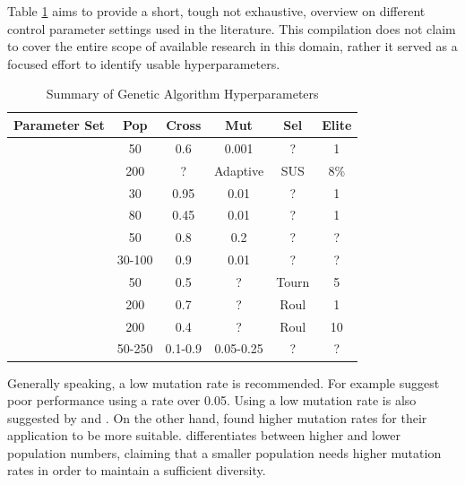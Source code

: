 Table \ref{tab:ga_hyperparameters} aims to provide a short, tough not exhaustive, overview on different control parameter settings used in the literature. This compilation does not claim to cover the entire scope of available research in this domain, rather it served as a focused effort to identify usable hyperparameters.

\begin{table}[h]
	\centering
	\caption{Summary of Genetic Algorithm Hyperparameters}
	\label{tab:ga_hyperparameters}
	\begin{tabular}{lccccc}
		\hline
		\textbf{Parameter Set} & \textbf{Pop} & \textbf{Cross} & \textbf{Mut} & \textbf{Sel} & \textbf{Elite} \\
		\hline
		\cite{de_jong_analysis_1975} & 50 & 0.6 & 0.001 & ? & 1 \\
		\cite{mills_determining_2015} & 200 & ? & Adaptive & SUS & 8\% \\
		\cite{grefenstette_optimization_1986} & 30 & 0.95 & 0.01 & ? & 1 \\
		\cite{grefenstette_optimization_1986} & 80 & 0.45 & 0.01 & ? & 1 \\
		\cite{almanee_scenorita_2021} & 50 & 0.8 & 0.2 & ? & ? \\
		\cite{srinivas_genetic_1994}  & 30-100 & 0.9 & 0.01 & ? & ? \\
		\cite{fazal_estimating_2005} & 50 & 0.5 & ? & Tourn & 5 \\
		\cite{dao_maximising_2016} & 200 & 0.7 & ? & Roul & 1 \\
		\cite{naruka_parameter_2019} & 200 & 0.4 & ? & Roul & 10 \\
		\cite{jinghui_zhong_comparison_2005} & 50-250 & 0.1-0.9 & 0.05-0.25 & ? & ? \\
		\hline
	\end{tabular}
\end{table}

Generally speaking, a low mutation rate is recommended. For example \cite{grefenstette_optimization_1986} suggest poor performance using a rate over 0.05. Using a low mutation rate is also suggested by \cite{whitley_genetic_1994} and \cite{jinghui_zhong_comparison_2005}. On the other hand, \cite{boyabatli_parameter_2004} found higher mutation rates for their application to be more suitable. \cite{srinivas_genetic_1994} differentiates between higher and lower population numbers, claiming that a smaller population needs higher mutation rates in order to maintain a sufficient diversity.



